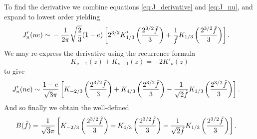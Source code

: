 To find the derivative we combine equations \eqref{eq:J_derivative} and \eqref{eq:J_nu}, and expand to lowest order yielding
\begin{align}
J'_n(ne) \sim {} & -\dfrac{1}{2\pi}\sqrt{\dfrac{2}{3}}(1-e)\left[2^{3/2}K'_{1/3}\left(\dfrac{2^{3/2}\tilde{f}}{3}\right) + \dfrac{1}{\tilde{f}}K_{1/3}\left(\dfrac{2^{3/2}\tilde{f}}{3}\right)\right].
\end{align}
We may re-express the derivative using the recurrence formula \citep[section 3.71]{Watson1995}
\begin{equation}
K_{\nu-1}(z) + K_{\nu+1}(z) = -2K'_\nu(z)
\end{equation}
to give
\begin{align}
J'_n(ne)  \sim {} & \dfrac{1-e}{\sqrt{3}\pi}\left[K_{-2/3}\left(\dfrac{2^{3/2}\tilde{f}}{3}\right) + K_{4/3}\left(\dfrac{2^{3/2}\tilde{f}}{3}\right) - \dfrac{1}{\sqrt{2}\tilde{f}}K_{1/3}\left(\dfrac{2^{3/2}\tilde{f}}{3}\right)\right].
\end{align}
And so finally we obtain the well-defined
\begin{align}
B(\tilde{f})  = {} & \dfrac{1}{\sqrt{3}\pi}\left[K_{-2/3}\left(\dfrac{2^{3/2}\tilde{f}}{3}\right) + K_{4/3}\left(\dfrac{2^{3/2}\tilde{f}}{3}\right) - \dfrac{1}{\sqrt{2}\tilde{f}}K_{1/3}\left(\dfrac{2^{3/2}\tilde{f}}{3}\right)\right].
\end{align}

